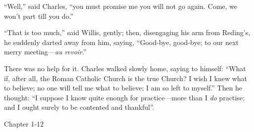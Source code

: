 ``Well,'' said Charles, ``you must promise me you will
not go again. Come, we won't part till you do.''

``That is too much,'' said Willis, gently; then,
disengaging his arm from Reding's, he suddenly darted away from him,
saying, ``Good-bye, good-bye; to our next merry meeting—\emph{au
revoir}.''

There was no help for it. Charles walked slowly home, saying to
himself: ``What if, after all, the Roman Catholic Church is the
true Church? I wish I knew what to believe; no one will tell me what
to believe; I am so left to myself.'' Then he thought: ``I
suppose I know quite enough for practice—more than I \emph{do}
practise; and I ought surely to be contented and thankful''.

Chapter 1-12


